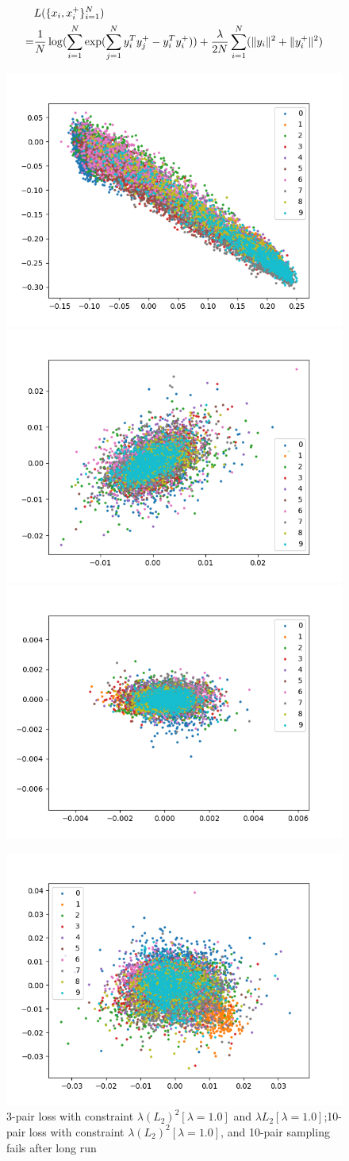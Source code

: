 \documentclass[10pt,twocolumn,letterpaper]{article}
\begin{document}
			\begin{align}
				&L(\{x_i,x_i^+\}^N_{i=1})\notag\\
				=&\frac{1}{N}\log(\sum_{i=1}^N\exp(\sum_{j=1}^Ny^T_iy_j^+-y_i^Ty_i^+))+ \frac{\lambda}{2N} \sum_{i=1}^N(\lVert y_i\rVert^2+ \lVert y^+_i\rVert^2)
			\end{align}
			\begin{figure}[t]

				\begin{center}
				\includegraphics[width=0.5\linewidth]{fig/fig1000}\includegraphics[width=0.5\linewidth]{fig/fig600}
				\includegraphics[width=0.5\linewidth]{fig/fig2500}
				 \caption{3-pair loss with constraint $\lambda (L_2)^2[\lambda=1.0]$ and $\lambda L_2[\lambda=1.0]$;10-pair loss with constraint $\lambda (L_2)^2[\lambda=1.0]$, and 10-pair sampling fails after long run}
   				\includegraphics[width=0.9\linewidth]{fig/fig150}

\end{center}
\end{figure}
\end{document}
